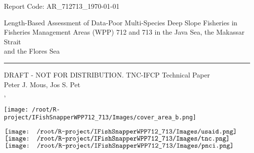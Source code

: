\begin{titlepage}
\begin{flushleft}
	\textsf{Report Code: AR\_712713\_{\today}}
\end{flushleft}

\vspace*{1.1cm}
\begin{flushright}
        {\Large\textsf{Length-Based Assessment of Data-Poor Multi-Species Deep Slope Fisheries in 
        \\[0.2cm]Fisheries Management Areas (WPP) 712 and 713 in the Java Sea, the Makassar Strait 
        \\[0.2cm]and the Flores Sea}}\\[0.2cm]
        \rule{\linewidth}{0.5mm}
        \textsf{DRAFT - NOT FOR DISTRIBUTION. TNC-IFCP Technical Paper}\\[2cm]
        \textsf{Peter J. Mous, Jos S. Pet\\[1cm]
        {\MakeUppercase{\MONTH}} {\the\day}, {\the\year}}
\end{flushright}

\begin{center}
\texttt{[image: /root/R-project/IFishSnapperWPP712\_713/Images/cover\_area\_b.png]}
\end{center}

\vfill

\noindent
\begin{minipage}[b]{\linewidth}
\noindent
\centering
$\vcenter{\hbox{\texttt{[image: /root/R-project/IFishSnapperWPP712\_713/Images/usaid.png]}}}$
\hfill
$\vcenter{\hbox{\texttt{[image: /root/R-project/IFishSnapperWPP712\_713/Images/tnc.png]}}}$
\hfill
$\vcenter{\hbox{\texttt{[image: /root/R-project/IFishSnapperWPP712\_713/Images/pnci.png]}}}$
\end{minipage}
\end{titlepage}